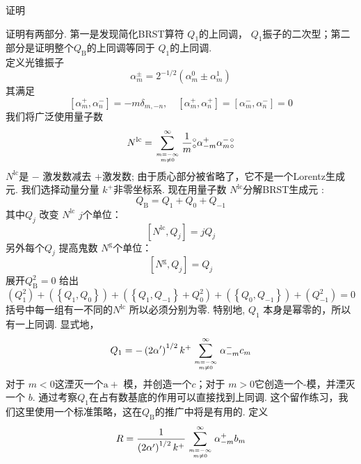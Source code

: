 \centerline{\Large 证明}
证明有两部分. 第一是发现简化BRST算符 $Q_{1}$的上同调， $Q_{1}$振子的二次型；第二部分是证明整个$Q_{\mathrm{B}}$的上同调等同于 $Q_{1}$的上同调.\\
定义光锥振子
\begin{equation}
\alpha_{m}^{\pm}=2^{-1 / 2}\left(\alpha_{m}^{0} \pm \alpha_{m}^{1}\right)
\end{equation}
其满足
\begin{equation}
\left[\alpha_{m}^{+}, \alpha_{n}^{-}\right]=-m \delta_{m,-n}, \quad\left[\alpha_{m}^{+}, \alpha_{n}^{+}\right]=\left[\alpha_{m}^{-}, \alpha_{n}^{-}\right]=0
\end{equation}
我们将广泛使用量子数
\begin{equation}
N^{\mathrm{lc}}=\sum_{m=-\infty \atop m \neq 0}^{\infty} \frac{1}{m}{}_\circ^\circ \alpha_{-m}^{+} \alpha_{m}^{-}{}_\circ^\circ
\end{equation}
$N^{\mathrm{lc}}$是 $-$ 激发数减去 $+$激发数; 由于质心部分被省略了，它不是一个Lorentz生成元. 我们选择动量分量 $k^{+}$非零坐标系. 
现在用量子数 $N^{\mathrm{lc}}$分解BRST生成元 :
\begin{equation}
Q_{\mathrm{B}}=Q_{1}+Q_{0}+Q_{-1}
\end{equation}
其中$Q_{j}$ 改变 $N^{\mathrm{lc}}$   $j$个单位：
\begin{equation}
\left[N^{\mathrm{lc}}, Q_{j}\right]=j Q_{j}
\end{equation}
另外每个$Q_{j}$ 提高鬼数 $N^{\mathrm{g}}$个单位：
\begin{equation}
\left[N^{\mathrm{g}}, Q_{j}\right]=Q_{j}
\end{equation}
展开$Q_{\mathrm{B}}^{2}=0$ 给出
\begin{equation}
\left(Q_{1}^{2}\right)+\left(\left\{Q_{1}, Q_{0}\right\}\right)+\left(\left\{Q_{1}, Q_{-1}\right\}+Q_{0}^{2}\right)+\left(\left\{Q_{0}, Q_{-1}\right\}\right)+\left(Q_{-1}^{2}\right)=0
\end{equation}
括号中每一组有一不同的$N^{\mathrm{lc}}$ 所以必须分别为零. 特别地, $Q_{1}$ 本身是幂零的，所以有一上同调. 显式地，
\begin{equation}
Q_{1}=-\left(2 \alpha^{\prime}\right)^{1 / 2} k^{+} \sum_{m=-\infty \atop m \neq 0}^{\infty} \alpha_{-m}^{-} c_{m}
\end{equation}
对于 $m<0$这湮灭一个$\mathrm{a}+$ 模，并创造一个$c$；对于 $m>0$它创造一个-模，并湮灭一个 $b$. 通过考察$Q_{1}$在占有数基底的作用可以直接找到上同调. 这个留作练习，我们这里使用一个标准策略，这在$Q_{\mathrm{B}}$的推广中将是有用的. 定义
\begin{equation}
R=\frac{1}{\left(2 \alpha^{\prime}\right)^{1 / 2} k^{+}} \sum_{m=-\infty \atop m \neq 0}^{\infty} \alpha_{-m}^{+} b_{m}
\end{equation}
